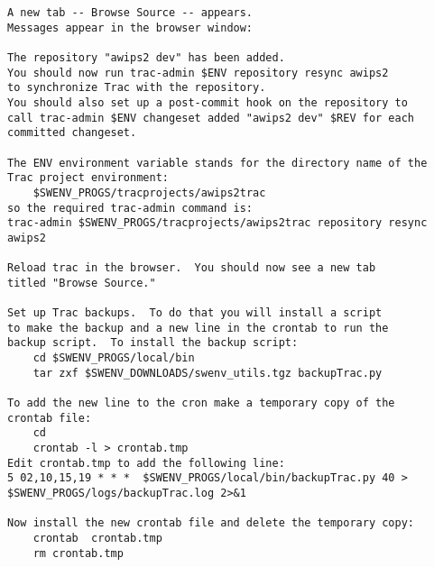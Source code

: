 \begin{verbatim}
A new tab -- Browse Source -- appears.  
Messages appear in the browser window:

The repository "awips2 dev" has been added.  
You should now run trac-admin $ENV repository resync awips2 
to synchronize Trac with the repository.
You should also set up a post-commit hook on the repository to 
call trac-admin $ENV changeset added "awips2 dev" $REV for each 
committed changeset.

The ENV environment variable stands for the directory name of the 
Trac project environment:
    $SWENV_PROGS/tracprojects/awips2trac
so the required trac-admin command is:
trac-admin $SWENV_PROGS/tracprojects/awips2trac repository resync awips2

Reload trac in the browser.  You should now see a new tab 
titled "Browse Source."

Set up Trac backups.  To do that you will install a script
to make the backup and a new line in the crontab to run the
backup script.  To install the backup script:
    cd $SWENV_PROGS/local/bin
    tar zxf $SWENV_DOWNLOADS/swenv_utils.tgz backupTrac.py

To add the new line to the cron make a temporary copy of the 
crontab file:
    cd
    crontab -l > crontab.tmp
Edit crontab.tmp to add the following line:
5 02,10,15,19 * * *  $SWENV_PROGS/local/bin/backupTrac.py 40 > $SWENV_PROGS/logs/backupTrac.log 2>&1

Now install the new crontab file and delete the temporary copy:
    crontab  crontab.tmp
    rm crontab.tmp


\end{verbatim}


